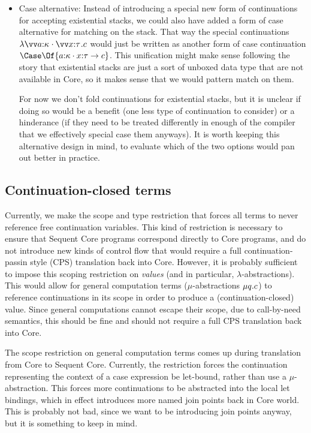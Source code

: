 \documentclass{article}
\begin{document}
\begin{itemize}
\item Case alternative: Instead of introducing a special new form of
  continuations for accepting existential stacks, we could also have added a
  form of case alternative for matching on the stack.  That way the special
  continuations $\fnk{\packs{\vect{\ann a \ki}}{\vect{\ann x \ty}}}\com$ would
  just be written as another form of case continuation
  $\Case\Of{\packs{\ann a \ki}{\ann x \ty} \to \com}$.  This unification might
  make sense following the story that existential stacks are just a sort of
  unboxed data type that are not available in Core, so it makes sense that we
  would pattern match on them.

  For now we don't fold continuations for existential stacks, but it is unclear
  if doing so would be a benefit (one less type of continuation to consider) or
  a hinderance (if they need to be treated differently in enough of the compiler
  that we effectively special case them anyways).  It is worth keeping this
  alternative design in mind, to evaluate which of the two options would pan out
  better in practice.
\end{itemize}

\subsection{Continuation-closed terms}

Currently, we make the scope and type restriction that forces all terms to never
reference free continuation variables.  This kind of restriction is necessary to
ensure that Sequent Core programs correspond directly to Core programs, and do
not introduce new kinds of control flow that would require a full
continuation-passin style (CPS) translation back into Core.  However, it is
probably sufficient to impose this scoping restriction on \emph{values} (and in
particular, $\lambda$-abstractions).  This would allow for general computation
terms ($\mu$-abstractions $\mu{q}.c$) to reference continuations in its
scope in order to produce a (continuation-closed) value.  Since general
computations cannot escape their scope, due to call-by-need semantics, this
should be fine and should not require a full CPS translation back into Core.

The scope restriction on general computation terms comes up during translation
from Core to Sequent Core.  Currently, the restriction forces the continuation
representing the context of a case expression be let-bound, rather than use a
$\mu$-abstraction.  This forces more continuations to be abstracted into the
local let bindings, which in effect introduces more named join points back in
Core world.  This is probably not bad, since we want to be introducing join
points anyway, but it is something to keep in mind.
\end{document}
